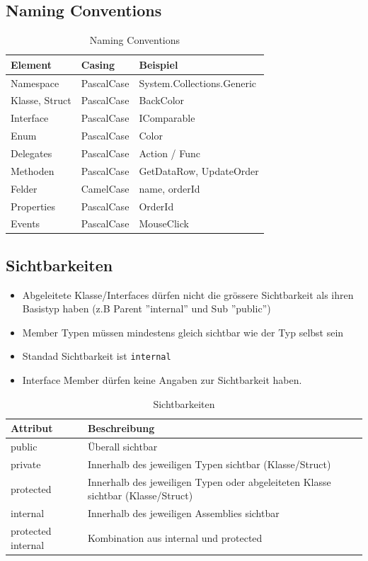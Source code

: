 \documentclass[
a4paper,
oneside,
10pt,
fleqn,
headsepline,
toc=listofnumbered, 
bibliography=totocnumbered]{scrartcl}
\begin{document}
\subsection{Naming Conventions}
\begin{table}[h]
	\centering
	\begin{tabu} to \linewidth {l l l}
		\toprule 
		Element & Casing  & Beispiel \\
		\midrule
		Namespace & PascalCase & System.Collections.Generic \\
		Klasse, Struct & PascalCase & BackColor \\
		Interface & PascalCase & IComparable\\
		Enum & PascalCase & Color\\
		Delegates & PascalCase & Action / Func\\
		Methoden & PascalCase & GetDataRow, UpdateOrder\\
		Felder & CamelCase & name, orderId \\
		Properties & PascalCase & OrderId \\
		Events & PascalCase & MouseClick \\
		\bottomrule
	\end{tabu} 
	\caption{Naming Conventions}
\end{table}

\subsection{Sichtbarkeiten}
\begin{itemize}
	\item Abgeleitete Klasse/Interfaces dürfen nicht die grössere Sichtbarkeit als ihren Basistyp haben (z.B Parent ''internal'' und Sub ''public'')
	\item Member Typen müssen mindestens gleich sichtbar wie der Typ selbst sein
	\item Standad Sichtbarkeit ist \lstinline|internal|
	\item Interface Member dürfen keine Angaben zur Sichtbarkeit haben.
\end{itemize}
\begin{table}[h]
	\centering
	\begin{tabu} to \linewidth {l l}
		\toprule 
		Attribut & Beschreibung \\
		\midrule
		public & Überall sichtbar \\
		private & Innerhalb des jeweiligen Typen sichtbar (Klasse/Struct) \\
		protected & Innerhalb des jeweiligen Typen oder abgeleiteten Klasse sichtbar (Klasse/Struct) \\
		internal & Innerhalb des jeweiligen Assemblies sichtbar \\
		protected internal & Kombination aus internal und protected \\
		\bottomrule
	\end{tabu} 
	\caption{Sichtbarkeiten}
\end{table}
\end{document}
